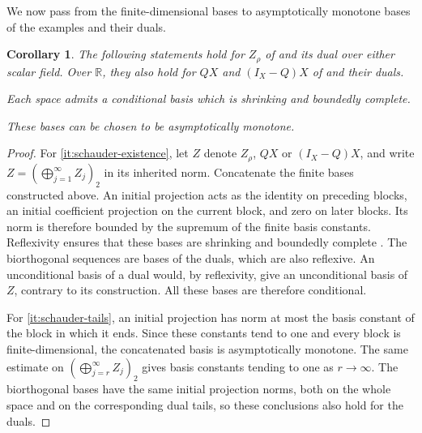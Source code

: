 \documentclass[11pt,a4paper,reqno]{amsart}
\newtheorem{corollary}[corollary]{Corollary}
\theoremstyle{definition}
\newcommand{\R}{\mathbb R}
\numberwithin{equation}{section}
\begin{document}
We now pass from the finite-dimensional bases to asymptotically monotone bases of the examples and their duals.

\begin{corollary}\label{cor:schauder-bases}
The following statements hold for $Z_\rho$ of  and its dual over either scalar field. Over $\R$, they also hold for $QX$ and $(I_X-Q)X$ of  and their duals.
\begin{resultparts}
\item\label{it:schauder-existence}
Each space admits a conditional basis which is shrinking and boundedly complete.
\item\label{it:schauder-tails}
These bases can be chosen to be asymptotically monotone.
\end{resultparts}
\end{corollary}

\begin{proof}
For \ref{it:schauder-existence}, let $Z$ denote $Z_\rho$, $QX$ or $(I_X-Q)X$, and write $Z=(\bigoplus_{j=1}^{\infty}Z_j)_2$ in its inherited norm. Concatenate the finite bases constructed above. An initial projection acts as the identity on preceding blocks, an initial coefficient projection on the current block, and zero on later blocks. Its norm is therefore bounded by the supremum of the finite basis constants. Reflexivity ensures that these bases are shrinking and boundedly complete \cite[Theorem~1.b.5]{LindenstraussTzafriri1977}. The biorthogonal sequences are bases of the duals, which are also reflexive. An unconditional basis of a dual would, by reflexivity, give an unconditional basis of $Z$, contrary to its construction. All these bases are therefore conditional.

For \ref{it:schauder-tails}, an initial projection has norm at most the basis constant of the block in which it ends. Since these constants tend to one and every block is finite-dimensional, the concatenated basis is asymptotically monotone. The same estimate on $(\bigoplus_{j=r}^{\infty}Z_j)_2$ gives basis constants tending to one as $r\to\infty$. The biorthogonal bases have the same initial projection norms, both on the whole space and on the corresponding dual tails, so these conclusions also hold for the duals.
\end{proof}
\end{document}
